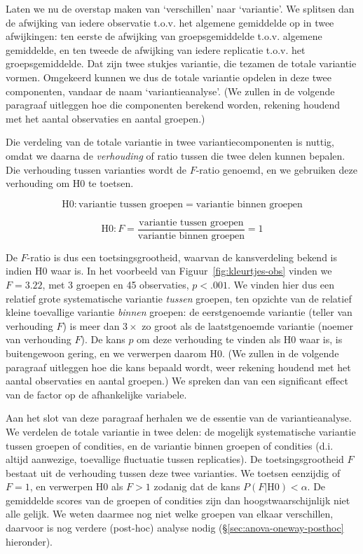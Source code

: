 \documentclass[
]{book}
\begin{document}
Laten we nu de overstap maken van `verschillen' naar `variantie'. We
splitsen dan de afwijking van iedere observatie t.o.v. het algemene
gemiddelde op in twee afwijkingen: ten eerste de afwijking van
groepsgemiddelde t.o.v. algemene gemiddelde, en ten tweede de afwijking
van iedere replicatie t.o.v. het groepsgemiddelde. Dat zijn twee stukjes
variantie, die tezamen de totale variantie vormen. Omgekeerd kunnen we
dus de totale variantie opdelen in deze twee componenten, vandaar de
naam `variantieanalyse'. (We zullen in de volgende paragraaf uitleggen
hoe die componenten berekend worden, rekening houdend met het aantal
observaties en aantal groepen.)

Die verdeling van de totale variantie in twee variantiecomponenten is
nuttig, omdat we daarna de \emph{verhouding} of ratio tussen die twee delen
kunnen bepalen. Die verhouding tussen varianties wordt de \(F\)-ratio
genoemd, en we gebruiken deze verhouding om H0 te toetsen.

\[\textrm{H0}: \textrm{variantie tussen groepen} = \textrm{variantie binnen groepen}\]

\[\textrm{H0}: F = \frac{\textrm{variantie tussen groepen}}{\textrm{variantie binnen groepen}} = 1\]

De \(F\)-ratio is dus een toetsingsgrootheid, waarvan de kansverdeling
bekend is indien H0 waar is. In het voorbeeld van
Figuur~\ref{fig:kleurtjes-obs} vinden we \(F=3.22\), met 3 groepen en 45
observaties, \(p<.001\). We vinden hier dus een relatief grote
systematische variantie \emph{tussen} groepen, ten opzichte van de relatief
kleine toevallige variantie \emph{binnen} groepen: de eerstgenoemde variantie
(teller van verhouding \(F\)) is meer dan \(3\times\) zo groot als de
laatstgenoemde variantie (noemer van verhouding \(F\)). De kans \(p\) om
deze verhouding te vinden als H0 waar is, is buitengewoon gering, en we
verwerpen daarom H0. (We zullen in de volgende paragraaf uitleggen hoe
die kans bepaald wordt, weer rekening houdend met het aantal observaties
en aantal groepen.) We spreken dan van een significant effect van de
factor op de afhankelijke variabele.

Aan het slot van deze paragraaf herhalen we de essentie van de
variantieanalyse. We verdelen de totale variantie in twee delen: de
mogelijk systematische variantie tussen groepen of condities, en de
variantie binnen groepen of condities (d.i. altijd aanwezige, toevallige
fluctuatie tussen replicaties). De toetsingsgrootheid \(F\) bestaat uit de
verhouding tussen deze twee varianties. We toetsen eenzijdig of \(F=1\),
en verwerpen H0 als \(F>1\) zodanig dat de kans
\(P(F|\textrm{H0}) < \alpha\). De gemiddelde scores van de groepen of
condities zijn dan hoogstwaarschijnlijk niet alle gelijk. We weten
daarmee nog niet welke groepen van elkaar verschillen, daarvoor is nog
verdere (post-hoc) analyse nodig
(§\ref{sec:anova-oneway-posthoc} hieronder).
\end{document}
